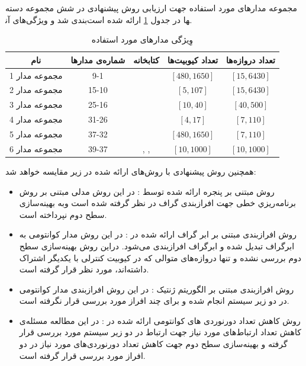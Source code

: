 مجموعه مدارهای مورد استفاده جهت ارزیابی روش پیشنهادی در شش مجموعه دسته بندی شد و ویژگی‌های آن‎ها در جدول \ref{charachter} ارائه شده است.
\begin{table}[h]
\centering
\caption{وِیژگی مدارهای مورد استفاده}
\label{charachter}
\begin{tabular}{c|c|c|c|c}

نام &شماره‌ی مدارها& کتابخانه& تعداد کیوبیت‌ها& تعداد دروازه‌ها\\
\hline
مجموعه مدار 1 &9-1&\cite{maslov2005reversible} &$[480,1650]$&$[15,6430]$\\
\hline
مجموعه مدار 2 &15-10&\cite{Wille} &$[5,107]$&$[15,6430]$\\
\hline
مجموعه مدار 3&25-16&\cite{cross2017open}&$[10,40]$&$[40,500]$\\
\hline
مجموعه مدار 4&31-26&\cite{Wille}&$[4,17]$&$[7,110]$\\
\hline
مجموعه مدار 5&37-32&\cite{Wille} &$[480,1650]$&$[7,110]$\\
\hline
مجموعه مدار 6& 39-37&\cite{fowler2004scalability}, \cite{childs2003quantum}, \cite{whitfield2011simulation} &$[10,1000]$&$[10,1000]$\\

\end{tabular}
\end{table}




همچنين روش پیشنهادی با روش‌های ارائه شده در زیر مقایسه خواهد شد:
\begin{itemize}
\item
روش مبتنی بر پنجره ارائه شده توسط \cite{nikahd2021automated}: در این روش مدلی مبتنی بر روش برنامه‌ريزي خطی جهت افرازبندی گراف در نظر گرفته شده است وبه بهینه‌سازی سطح دوم نپرداخته است.
\item
روش افرازبندی مبتنی بر ابر گراف ارائه شده در \cite{Pablo}: در این روش مدار کوانتومی به ابرگراف تبدیل شده و ابرگراف افرازبندی می‌شود. دراین روش بهینه‌سازی سطح دوم بررسی نشده و تنها دروازه‌های متوالی که در کیوبیت کنترلی با یکدیگر اشتراک داشته‌اند، مورد نظر قرار گرفته است.
\item
روش افرازبندی مبتنی بر الگوریتم ژنتیک \cite{ZomorodiE}: در این روش افرازبندی مدار کوانتومی در دو زیر سیستم انجام شده و برای چند افراز مورد بررسی قرار نگرفته است.
\item
روش کاهش تعداد دورنوردی های کوانتومی ارائه شده در  \cite{Zomorodi}: در این مطالعه مسئله‌ی کاهش تعداد ارتباط‌های مورد نیاز جهت ارتباط در دو زیر سیستم مورد بررسی قرار گرفته و بهینه‌سازی سطح دوم جهت کاهش تعداد دورنوردی‌های مورد نیاز در دو افراز مورد بررسی قرار گرفته است.
\end{itemize}

